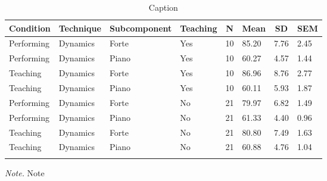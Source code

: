 \documentclass[
  man,floatsintext]{apa6}
\begin{document}
\begin{table}[tbp]

\begin{center}
\begin{threeparttable}

\caption{\label{tab:dyn-teaching-desc-1}Caption}

\begin{tabular}{llllllll}
\toprule
Condition & \multicolumn{1}{c}{Technique} & \multicolumn{1}{c}{Subcomponent} & \multicolumn{1}{c}{Teaching} & \multicolumn{1}{c}{N} & \multicolumn{1}{c}{Mean} & \multicolumn{1}{c}{SD} & \multicolumn{1}{c}{SEM}\\
\midrule
Performing & Dynamics & Forte & Yes & 10 & 85.20 & 7.76 & 2.45\\
Performing & Dynamics & Piano & Yes & 10 & 60.27 & 4.57 & 1.44\\
Teaching & Dynamics & Forte & Yes & 10 & 86.96 & 8.76 & 2.77\\
Teaching & Dynamics & Piano & Yes & 10 & 60.11 & 5.93 & 1.87\\
Performing & Dynamics & Forte & No & 21 & 79.97 & 6.82 & 1.49\\
Performing & Dynamics & Piano & No & 21 & 61.33 & 4.40 & 0.96\\
Teaching & Dynamics & Forte & No & 21 & 80.80 & 7.49 & 1.63\\
Teaching & Dynamics & Piano & No & 21 & 60.88 & 4.76 & 1.04\\
\bottomrule
\addlinespace
\end{tabular}

\begin{tablenotes}[para]
\normalsize{\textit{Note.} Note}
\end{tablenotes}

\end{threeparttable}
\end{center}

\end{table}
\end{document}

